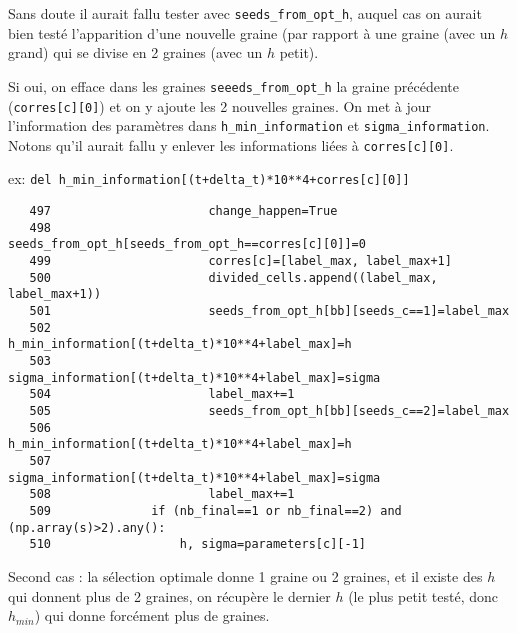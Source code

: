 \documentclass{article}
\def \mycolor {red}
\begin{document}
Sans doute il aurait fallu tester avec \verb|seeds_from_opt_h|, auquel cas on aurait bien test\'e l'apparition d'une nouvelle graine (par rapport \`a une graine (avec un $h$ grand) qui se divise en 2 graines (avec un $h$ petit).

Si oui, on efface dans les graines  \verb|seeeds_from_opt_h| la graine pr\'ec\'edente (\verb|corres[c][0]|) et on y ajoute les 2 nouvelles graines. On met \`a jour l'information des param\`etres dans \verb|h_min_information| et \verb|sigma_information|. Notons qu'il aurait fallu y enlever les informations li\'ees \`a \verb|corres[c][0]|.

ex: \verb|del h_min_information[(t+delta_t)*10**4+corres[c][0]]|

\color{black}
\begin{verbatim} 
   497	                    change_happen=True
   498	                    seeds_from_opt_h[seeds_from_opt_h==corres[c][0]]=0
   499	                    corres[c]=[label_max, label_max+1]
   500	                    divided_cells.append((label_max, label_max+1))
   501	                    seeds_from_opt_h[bb][seeds_c==1]=label_max
   502	                    h_min_information[(t+delta_t)*10**4+label_max]=h
   503	                    sigma_information[(t+delta_t)*10**4+label_max]=sigma
   504	                    label_max+=1
   505	                    seeds_from_opt_h[bb][seeds_c==2]=label_max
   506	                    h_min_information[(t+delta_t)*10**4+label_max]=h
   507	                    sigma_information[(t+delta_t)*10**4+label_max]=sigma
   508	                    label_max+=1
   509	            if (nb_final==1 or nb_final==2) and (np.array(s)>2).any():
   510	                h, sigma=parameters[c][-1]
\end{verbatim} 
\color{\mycolor}
Second cas : la s\'election optimale donne 1 graine ou 2 graines, et il existe des $h$ qui donnent plus de 2 graines, on r\'ecup\`ere le dernier $h$ (le plus petit test\'e, donc $h_{min}$) qui donne forc\'ement plus de graines. 
\end{document}
